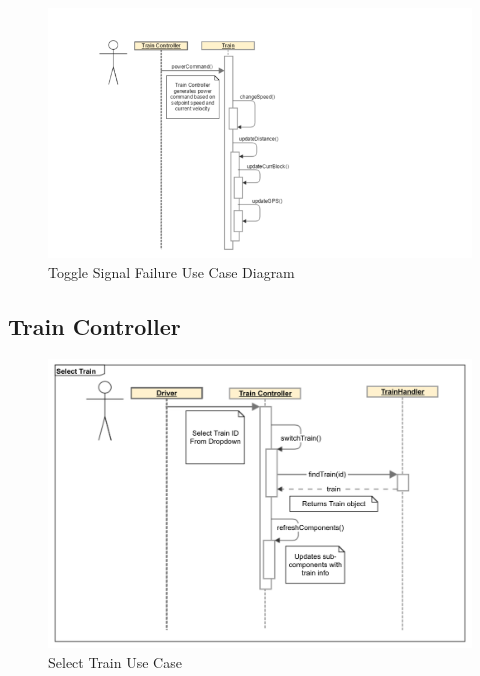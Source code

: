 \documentclass[]{article}
\begin{document}
\begin{figure}[H]
	\centering
	\includegraphics[scale=.5]{train_model_sqd_set_power.png}
	\caption{Toggle Signal Failure Use Case Diagram}
\end{figure}

\subsection{Train Controller}

\begin{figure}[H]
	\centering
	\includegraphics[scale=.5]{tc_selectTrain_usecase}
	\caption{Select Train Use Case}
\end{figure}
\end{document}
